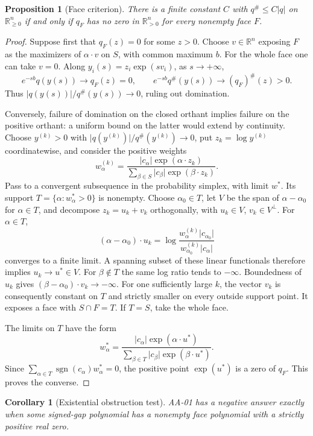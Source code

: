 \documentclass[11pt,a4paper]{article}
\newtheorem{corollary}[theorem]{Corollary}
\newtheorem{proposition}[theorem]{Proposition}
\theoremstyle{definition}
\theoremstyle{remark}
\newcommand{\R}{\mathbb R}
\newcommand{\abs}[1]{\lvert #1\rvert}
\newcommand{\maj}[1]{#1^{\#}}
\newcommand{\sgn}{\operatorname{sgn}}
\begin{document}
\begin{proposition}[Face criterion]\label{prop:faces}
There is a finite constant $C$ with $\maj q\le C\abs q$ on $\R_{\ge0}^n$
if and only if $q_F$ has no zero in $\R_{>0}^n$ for every nonempty face $F$.
\end{proposition}
\begin{proof}
Suppose first that $q_F(z)=0$ for some $z>0$. Choose $v\in\R^n$ exposing
$F$ as the maximizers of $\alpha\cdot v$ on $S$, with common maximum $b$.
For the whole face one can take $v=0$. Along
$y_i(s)=z_i\exp(sv_i)$, as $s\longrightarrow+\infty$,
\[
 e^{-sb}q(y(s))\longrightarrow q_F(z)=0,\qquad
 e^{-sb}\maj q(y(s))\longrightarrow\maj{(q_F)}(z)>0.
\]
Thus $\abs{q(y(s))}/\maj q(y(s))\longrightarrow0$, ruling out domination.

Conversely, failure of domination on the closed orthant implies failure on the
positive orthant: a uniform bound on the latter would extend by continuity.
Choose $y^{(k)}>0$ with $\abs{q(y^{(k)})}/\maj q(y^{(k)})\longrightarrow0$,
put $z_k=\log y^{(k)}$ coordinatewise, and consider the positive weights
\[
 w_\alpha^{(k)}=
 \frac{\abs{c_\alpha}\exp(\alpha\cdot z_k)}
      {\sum_{\beta\in S}\abs{c_\beta}\exp(\beta\cdot z_k)}.
\]
Pass to a convergent subsequence in the probability simplex, with limit $w^*$.
Its support $T=\{\alpha:w_\alpha^*>0\}$ is nonempty. Choose $\alpha_0\in T$,
let $V$ be the span of $\alpha-\alpha_0$ for $\alpha\in T$, and decompose
$z_k=u_k+v_k$ orthogonally, with $u_k\in V$, $v_k\in V^\perp$.
For $\alpha\in T$,
\[
 (\alpha-\alpha_0)\cdot u_k
 =\log\frac{w_\alpha^{(k)}\abs{c_{\alpha_0}}}
                 {w_{\alpha_0}^{(k)}\abs{c_\alpha}}
\]
converges to a finite limit. A spanning subset of these linear functionals
therefore implies $u_k\longrightarrow u^*\in V$. For $\beta\notin T$ the
same log ratio tends to $-\infty$. Boundedness of $u_k$ gives
$(\beta-\alpha_0)\cdot v_k\longrightarrow-\infty$.
For one sufficiently large $k$, the vector $v_k$ is consequently constant on
$T$ and strictly smaller on every outside support point. It exposes a face
with $S\cap F=T$. If $T=S$, take the whole face.

The limits on $T$ have the form
\[
 w_\alpha^*=
 \frac{\abs{c_\alpha}\exp(\alpha\cdot u^*)}
      {\sum_{\beta\in T}\abs{c_\beta}\exp(\beta\cdot u^*)}.
\]
Since $\sum_{\alpha\in T}\sgn(c_\alpha)w_\alpha^*=0$, the positive point
$\exp(u^*)$ is a zero of $q_F$. This proves the converse.
\end{proof}

\begin{corollary}[Existential obstruction test]
AA-01 has a negative answer exactly when some signed-gap polynomial has a
nonempty face polynomial with a strictly positive real zero.
\end{corollary}
\end{document}
